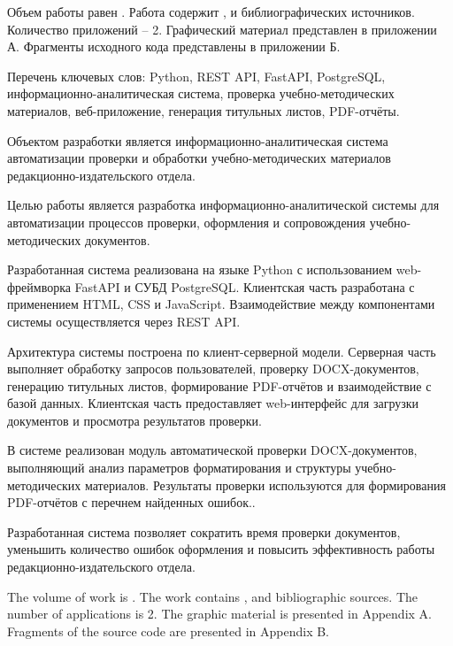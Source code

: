 
Объем работы равен . Работа содержит ,  
и  библиографических источников. Количество приложений – 2. Графический материал представлен в приложении А. Фрагменты исходного кода представлены в приложении Б.

Перечень ключевых слов: Python, REST API, FastAPI, PostgreSQL,
информационно-аналитическая система, проверка учебно-методических материалов, веб-приложение, генерация титульных листов, PDF-отчёты.

Объектом разработки является информационно-аналитическая система автоматизации проверки и обработки учебно-методических материалов редакционно-издательского отдела.

Целью работы является разработка информационно-аналитической системы для автоматизации процессов проверки, оформления и сопровождения учебно-методических документов.

Разработанная система реализована на языке Python с использованием web-фреймворка FastAPI и СУБД PostgreSQL. Клиентская часть разработана с применением HTML, CSS и JavaScript. Взаимодействие между компонентами системы осуществляется через REST API.

Архитектура системы построена по клиент-серверной модели. Серверная часть выполняет обработку запросов пользователей, проверку DOCX-документов, генерацию титульных листов, формирование PDF-отчётов и взаимодействие с базой данных. Клиентская часть предоставляет web-интерфейс для загрузки документов и просмотра результатов проверки.

В системе реализован модуль автоматической проверки DOCX-документов, выполняющий анализ параметров форматирования и структуры учебно-методических материалов. Результаты проверки используются для формирования PDF-отчётов с перечнем найденных ошибок..

Разработанная система позволяет сократить время проверки документов, уменьшить количество ошибок оформления и повысить эффективность работы редакционно-издательского отдела.





The volume of work is . The work contains , and  bibliographic sources. The number of applications is 2. The graphic material is presented in Appendix A. Fragments of the source code are presented in Appendix B.


